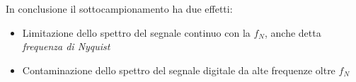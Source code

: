 \documentclass[journal]{IEEEtran}
\begin{document}
In conclusione il sottocampionamento ha due effetti:
\begin{itemize}
    \item Limitazione dello spettro del segnale continuo con la $f_N$, anche detta \textit{frequenza di Nyquist}
    \item Contaminazione dello spettro del segnale digitale da alte frequenze oltre $f_N$
\end{itemize}

\end{document}
